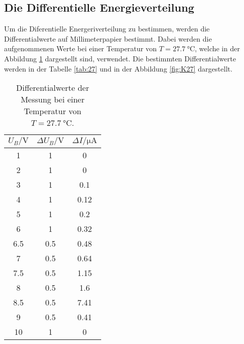 \subsection{Die Differentielle Energieverteilung}
Um die Diferentielle Energeriverteilung zu bestimmen, werden die Differentialwerte auf Millimeterpapier bestimmt.
Dabei werden die aufgenommenen Werte bei einer Temperatur von $T = \qty{27.7}{\degreeCelsius}$, welche in der Abbildung \ref{fig:27} dargestellt sind, verwendet.
Die bestimmten Differentialwerte werden in der Tabelle \ref{tab:27} und in der Abbildung \ref{fig:K27} dargestellt.
\begin{table}[H]
    \centering
    \caption{Differentialwerte der Messung bei einer Temperatur von $T = \qty{27.7}{\degreeCelsius}$.}
    \label{fig:27}
    \begin{tabular}{c c c}
        \toprule
        $U_B / \unit{\volt}$ & $\Delta U_B/\unit{\volt}$ & $\Delta I/\unit{\micro\ampere}$  \\
        \midrule
        1   & 1   &  0\\
        2   & 1   &  0\\
        3   & 1   &  0.1\\
        4   & 1   &  0.12\\
        5   & 1   &  0.2\\
        6   & 1   &  0.32\\
        6.5 & 0.5 &  0.48\\
        7   & 0.5 &  0.64\\
        7.5 & 0.5 &  1.15\\
        8   & 0.5 &  1.6\\
        8.5 & 0.5 &  7.41\\
        9   & 0.5 &  0.41\\
        10  & 1   &  0 \\
        \bottomrule
    \end{tabular}
\end{table}

